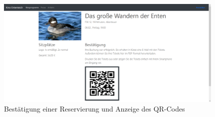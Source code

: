 \begin{figure}[ht]
	\centering
	\includegraphics[width=0.98\textwidth]{img/screenshots/vorstellung04}
	\captionsetup{format=hang}
	\caption{Bestätigung einer Reservierung und Anzeige des \acs{QR-Code}s}
	\label{fig:vorstellung04}
\end{figure}